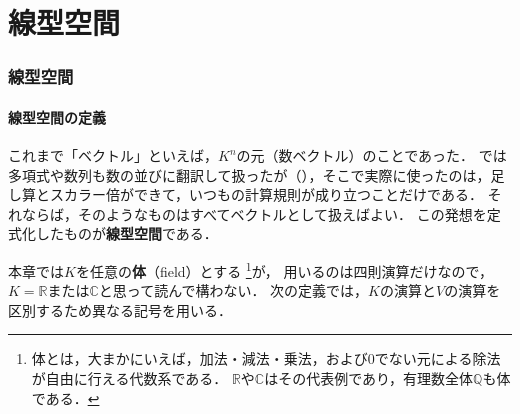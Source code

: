 \part{線型空間}

\begin{abstract}
  数ベクトルを抽象化した\textbf{線型空間}を導入し，多項式や関数なども同じ枠組みで扱えるようにする．
  さらに，線型部分空間・基底・次元を定義し，基底の取替えによる座標の変化を調べる．
\end{abstract}

\section{線型空間}

\subsection{線型空間の定義}

これまで「ベクトル」といえば，$K^n$の元（数ベクトル）のことであった．
では多項式や数列も数の並びに翻訳して扱ったが（），そこで実際に使ったのは，足し算とスカラー倍ができて，いつもの計算規則が成り立つことだけである．
それならば，そのようなものはすべてベクトルとして扱えばよい．
この発想を定式化したものが\textbf{線型空間}である．

本章では$K$を任意の\textbf{体}（field）とする%
\footnote{体とは，大まかにいえば，加法・減法・乗法，および$0$でない元による除法が自由に行える代数系である．
$\mathbb{R}$や$\mathbb{C}$はその代表例であり，有理数全体$\mathbb{Q}$も体である．}が，
用いるのは四則演算だけなので，$K=\mathbb{R}$または$\mathbb{C}$と思って読んで構わない．
次の定義では，$K$の演算と$V$の演算を区別するため異なる記号を用いる．

